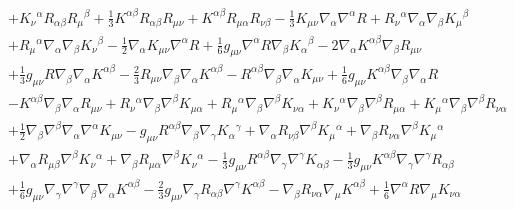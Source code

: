 \documentclass[10pt,letterpaper]{article}
\numberwithin{equation}{section}
\begin{document}
\begin{eqnarray}
&& + K_{\nu }{}^{\alpha } R_{\alpha \beta } R_{\mu }{}^{\beta } + \tfrac{1}{3} K^{\alpha \beta } R_{\alpha \beta } R_{\mu \nu } + K^{\alpha \beta } R_{\mu \alpha } R_{\nu \beta } -  \tfrac{1}{3} K_{\mu \nu } \nabla_{\alpha }\nabla^{\alpha }R + R_{\nu }{}^{\alpha } \nabla_{\alpha }\nabla_{\beta }K_{\mu }{}^{\beta } \nonumber \\ 
&& + R_{\mu }{}^{\alpha } \nabla_{\alpha }\nabla_{\beta }K_{\nu }{}^{\beta } -  \tfrac{1}{2} \nabla_{\alpha }K_{\mu \nu } \nabla^{\alpha }R + \tfrac{1}{6} g_{\mu \nu } \nabla^{\alpha }R \nabla_{\beta }K_{\alpha }{}^{\beta } - 2 \nabla_{\alpha }K^{\alpha \beta } \nabla_{\beta }R_{\mu \nu } \nonumber \\ 
&& + \tfrac{1}{3} g_{\mu \nu } R \nabla_{\beta }\nabla_{\alpha }K^{\alpha \beta } -  \tfrac{2}{3} R_{\mu \nu } \nabla_{\beta }\nabla_{\alpha }K^{\alpha \beta } -  R^{\alpha \beta } \nabla_{\beta }\nabla_{\alpha }K_{\mu \nu } + \tfrac{1}{6} g_{\mu \nu } K^{\alpha \beta } \nabla_{\beta }\nabla_{\alpha }R \nonumber \\ 
&& -  K^{\alpha \beta } \nabla_{\beta }\nabla_{\alpha }R_{\mu \nu } + R_{\nu }{}^{\alpha } \nabla_{\beta }\nabla^{\beta }K_{\mu \alpha } + R_{\mu }{}^{\alpha } \nabla_{\beta }\nabla^{\beta }K_{\nu \alpha } + K_{\nu }{}^{\alpha } \nabla_{\beta }\nabla^{\beta }R_{\mu \alpha } + K_{\mu }{}^{\alpha } \nabla_{\beta }\nabla^{\beta }R_{\nu \alpha } \nonumber \\ 
&& + \tfrac{1}{2} \nabla_{\beta }\nabla^{\beta }\nabla_{\alpha }\nabla^{\alpha }K_{\mu \nu } -  g_{\mu \nu } R^{\alpha \beta } \nabla_{\beta }\nabla_{\gamma }K_{\alpha }{}^{\gamma } + \nabla_{\alpha }R_{\nu \beta } \nabla^{\beta }K_{\mu }{}^{\alpha } + \nabla_{\beta }R_{\nu \alpha } \nabla^{\beta }K_{\mu }{}^{\alpha } \nonumber \\ 
&& + \nabla_{\alpha }R_{\mu \beta } \nabla^{\beta }K_{\nu }{}^{\alpha } + \nabla_{\beta }R_{\mu \alpha } \nabla^{\beta }K_{\nu }{}^{\alpha } -  \tfrac{1}{3} g_{\mu \nu } R^{\alpha \beta } \nabla_{\gamma }\nabla^{\gamma }K_{\alpha \beta } -  \tfrac{1}{3} g_{\mu \nu } K^{\alpha \beta } \nabla_{\gamma }\nabla^{\gamma }R_{\alpha \beta } \nonumber \\ 
&& + \tfrac{1}{6} g_{\mu \nu } \nabla_{\gamma }\nabla^{\gamma }\nabla_{\beta }\nabla_{\alpha }K^{\alpha \beta } -  \tfrac{2}{3} g_{\mu \nu } \nabla_{\gamma }R_{\alpha \beta } \nabla^{\gamma }K^{\alpha \beta } -  \nabla_{\beta }R_{\nu \alpha } \nabla_{\mu }K^{\alpha \beta } + \tfrac{1}{6} \nabla^{\alpha }R \nabla_{\mu }K_{\nu \alpha } \nonumber \\ 

\end{eqnarray}
\end{document}

